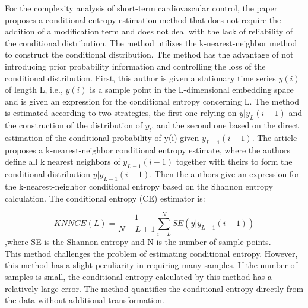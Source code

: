 For the complexity analysis of short-term cardiovascular control, the paper proposes a conditional entropy estimation method that does not require the addition of a modification term and does not deal with the lack of reliability of the conditional distribution. The method utilizes the k-nearest-neighbor method to construct the conditional distribution. The method has the advantage of not introducing prior probability information and controlling the loss of the conditional distribution. First, this author is given a stationary time series $y(i)$ of length L, i.e., $y(i)$ is a sample point in the L-dimensional embedding space and is given an expression for the conditional entropy concerning L. The method is estimated according to two strategies, the first one relying on $y|y_{L}(i-1)$ and the construction of the distribution of $y_{l}$, and the second one based on the direct estimation of the conditional probability of y(i) given $y_{L-1}(i-1) $. The article proposes a k-nearest-neighbor conditional entropy estimate, where the authors define all k nearest neighbors of $y_{L-1}(i-1) $ together with theirs to form the conditional distribution $y|y_{L-1}(i-1)$. Then the authors give an expression for the k-nearest-neighbor conditional entropy based on the Shannon entropy calculation. The conditional entropy (CE) estimator is:
   
\begin{equation}
    KNNCE(L) = \frac{1}{N-L+1}\sum_{i=L}^{N}SE(y|y_{L-1}(i-1))  
\end{equation}
,where SE is the Shannon entropy and N is the number of sample points.\\
This method challenges the problem of estimating conditional entropy. However, this method has a slight peculiarity in requiring many samples. If the number of samples is small, the conditional entropy calculated by this method has a relatively large error. The method quantifies the conditional entropy directly from the data without additional transformation.